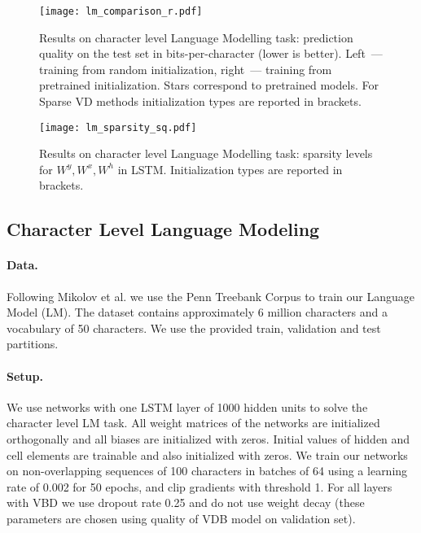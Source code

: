 \documentclass{article}
\begin{document}
\begin{figure*}[h]
    \centering
        \centering
                \texttt{[image: lm\_comparison\_r.pdf]}
        
        \caption{Results on character level Language Modelling task: prediction quality on the test set in bits-per-character (lower is better). Left~--- training from random initialization, right~--- training from pretrained initialization. Stars correspond to pretrained models. For Sparse VD methods initialization types are reported in brackets.}
        
        \label{fig:acc}
\end{figure*}

\begin{figure}[h]
    \centering
        \centering
                \texttt{[image: lm\_sparsity\_sq.pdf]}
        \caption{Results on character level Language Modelling task: sparsity levels for $W^y,W^x,W^h$ in LSTM. Initialization types are reported in brackets.}
        \label{fig:ard}
\end{figure}

\subsection{Character Level Language Modeling}
\vspace{-1mm}
\paragraph{Data.} Following Mikolov et al.  we use the Penn Treebank Corpus to train our Language Model (LM). The dataset contains approximately 6 million characters and a vocabulary of 50 characters. We use the provided train, validation and test partitions.
\vspace{-2mm}
\paragraph{Setup.} We use networks with one LSTM layer of 1000 hidden units to solve the character level LM task. 
All weight matrices of the networks are initialized orthogonally and all biases are initialized with zeros. Initial values of hidden and cell elements are trainable and also initialized with zeros.
We train our networks on non-overlapping sequences of 100 characters in batches of 64 using a learning rate of 0.002 for 50 epochs, and clip gradients with threshold 1. For all layers with VBD we use dropout rate 0.25 and do not use weight decay (these parameters are chosen using quality of VDB model on validation set).
\vspace{-2mm}
\end{document}
